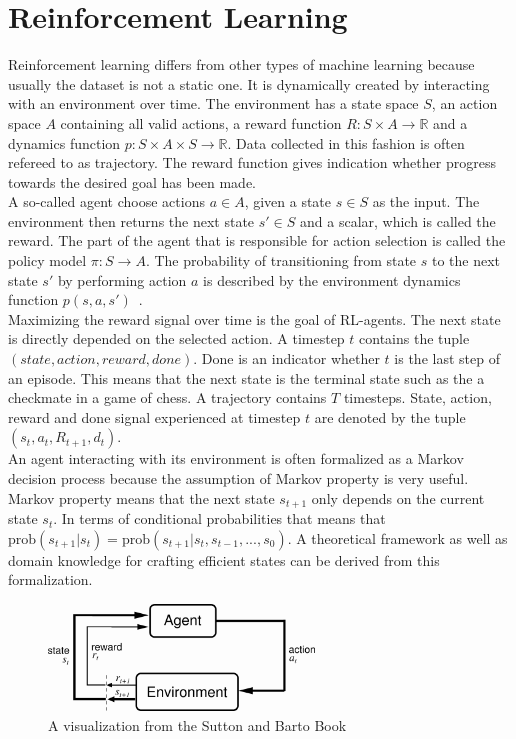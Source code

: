 \documentclass{article}
\begin{document}
\section{Reinforcement Learning}
Reinforcement learning differs from other types of machine learning because usually the dataset is not a static one.
It is dynamically created by interacting with an environment over time. The environment has
a state space $S$, an action space $A$ containing all valid actions, 
a reward function $R : S\times A \xrightarrow{} \mathbb{R}$ and a
dynamics function $p : S\times A\times S \xrightarrow{} \mathbb{R}$. Data collected
in this fashion is often refereed to as trajectory. The reward function gives indication 
whether progress towards the desired goal has been made.\\
A so-called agent choose actions $a \in A$, given a state $s \in S$ as the input. The environment then returns the next state $s' \in S$ and a scalar, which is called the reward. The part of the agent that is responsible for action selection is called the policy model $\pi : S \xrightarrow{} A$.
The probability of transitioning from state $s$ to the next state $s'$ by performing action $a$ is described by the environment dynamics function $p(s, a, s')$~\cite{Sutton1998}.\\
Maximizing the reward signal over time is the goal of RL-agents. The next state is directly depended on the
selected action. A timestep $t$ contains the tuple $(state, action, reward, done)$. Done is an indicator
whether $t$ is the last step of an episode. This means that the next state is the terminal state such as the a checkmate
in a game of chess. A trajectory contains $T$ timesteps.
State, action, reward and done signal experienced at timestep $t$ are denoted by the tuple $(s_t, a_t, R_{t+1}, d_t)$.\\
An agent interacting with its environment is often formalized as a Markov decision process because the assumption of Markov property is very useful.
Markov property means that the next state $s_{t+1}$ only depends on the current state $s_t$. 
In terms of conditional
probabilities that means that $\text{prob}(s_{t+1}|s_t) = \text{prob}(s_{t+1}|s_t,s_{t-1},...,s_0)$.
A theoretical framework as well as domain knowledge for crafting efficient states can be derived
from this formalization.

\begin{figure}[h]
  \centering
  \includegraphics[width = 200pt]{agent_env.png}
  \caption{A visualization from the Sutton and Barto Book~\cite{Sutton1998}}
\end{figure}
\end{document}
